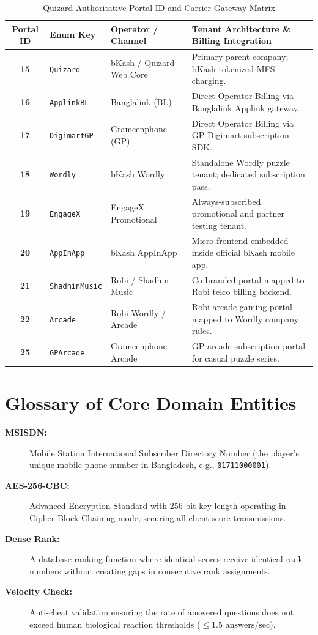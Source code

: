 \documentclass[11pt,a4paper,oneside]{report}
\begin{document}
\begin{table}[htbp]
\centering
\footnotesize
\begin{tabular}{|c|l|l|p{6.2cm}|}
\hline
\rowcolor{primaryBlue!15}
\textbf{Portal ID} & \textbf{Enum Key} & \textbf{Operator / Channel} & \textbf{Tenant Architecture \& Billing Integration} \\ \hline
\textbf{15} & \texttt{Quizard} & bKash / Quizard Web Core & Primary parent company; bKash tokenized MFS charging. \\ \hline
\textbf{16} & \texttt{ApplinkBL} & Banglalink (BL) & Direct Operator Billing via Banglalink Applink gateway. \\ \hline
\textbf{17} & \texttt{DigimartGP} & Grameenphone (GP) & Direct Operator Billing via GP Digimart subscription SDK. \\ \hline
\textbf{18} & \texttt{Wordly} & bKash Wordly & Standalone Wordly puzzle tenant; dedicated subscription pass. \\ \hline
\textbf{19} & \texttt{EngageX} & EngageX Promotional & Always-subscribed promotional and partner testing tenant. \\ \hline
\textbf{20} & \texttt{AppInApp} & bKash AppInApp & Micro-frontend embedded inside official bKash mobile app. \\ \hline
\textbf{21} & \texttt{ShadhinMusic} & Robi / Shadhin Music & Co-branded portal mapped to Robi telco billing backend. \\ \hline
\textbf{22} & \texttt{Arcade} & Robi Wordly / Arcade & Robi arcade gaming portal mapped to Wordly company rules. \\ \hline
\textbf{25} & \texttt{GPArcade} & Grameenphone Arcade & GP arcade subscription portal for casual puzzle series. \\ \hline
\end{tabular}
\caption{Quizard Authoritative Portal ID and Carrier Gateway Matrix}
\end{table}

\section{Glossary of Core Domain Entities}
\begin{description}
    \item[\textbf{MSISDN:}] Mobile Station International Subscriber Directory Number (the player's unique mobile phone number in Bangladesh, e.g., \texttt{01711000001}).
    \item[\textbf{AES-256-CBC:}] Advanced Encryption Standard with 256-bit key length operating in Cipher Block Chaining mode, securing all client score transmissions.
    \item[\textbf{Dense Rank:}] A database ranking function where identical scores receive identical rank numbers without creating gaps in consecutive rank assignments.
    \item[\textbf{Velocity Check:}] Anti-cheat validation ensuring the rate of answered questions does not exceed human biological reaction thresholds ($\le 1.5\text{ answers/sec}$).
\end{description}
\end{document}
